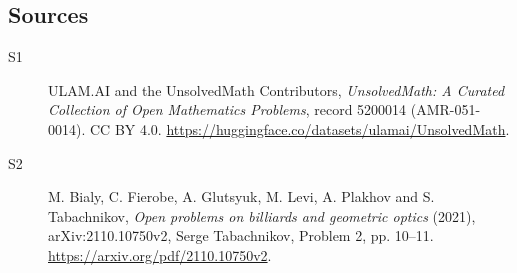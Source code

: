 \documentclass[11pt]{article}
\begin{document}
\subsection{Sources}
\begin{description}
\item[\hypertarget{source:5200014:1}{S1}] ULAM.AI and the UnsolvedMath Contributors, \emph{UnsolvedMath: A Curated Collection of Open Mathematics Problems}, record 5200014 (AMR-051-0014). CC BY 4.0. \url{https://huggingface.co/datasets/ulamai/UnsolvedMath}.
\item[\hypertarget{source:5200014:2}{S2}] M. Bialy, C. Fierobe, A. Glutsyuk, M. Levi, A. Plakhov and S. Tabachnikov, \emph{Open problems on billiards and geometric optics} (2021), arXiv:2110.10750v2, Serge Tabachnikov, Problem 2, pp. 10--11. \url{https://arxiv.org/pdf/2110.10750v2}.
\end{description}
\label{end:5200014}
\end{document}
